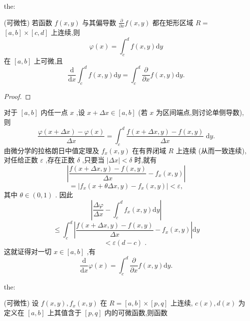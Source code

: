 \begin{theorem}{}{the:}

\end{theorem}
 (可微性) 若函数 \(f\left( {x,y}\right)\) 与其偏导数 \(\frac{\partial }{\partial x}f\left( {x,y}\right)\) 都在矩形区域 \(R =\)  \(\left\lbrack  {a,b}\right\rbrack   \times  \left\lbrack  {c,d}\right\rbrack\) 上连续,则
\[
\varphi \left( x\right)  = {\int }_{c}^{d}f\left( {x,y}\right) \mathrm{d}y
\]
在 \(\left\lbrack  {a,b}\right\rbrack\) 上可微,且
\[
\frac{\mathrm{d}}{\mathrm{d}x}{\int }_{c}^{d}f\left( {x,y}\right) \mathrm{d}y = {\int }_{c}^{d}\frac{\partial }{\partial x}f\left( {x,y}\right) \mathrm{d}y.
\]
\begin{proof}

\end{proof}
对于 \(\left\lbrack  {a,b}\right\rbrack\) 内任一点 \(x\) ,设 \(x + {\Delta x} \in  \left\lbrack  {a,b}\right\rbrack\) (若 \(x\) 为区间端点,则讨论单侧导数), 则
\[
\frac{\varphi \left( {x + {\Delta x}}\right)  - \varphi \left( x\right) }{\Delta x} = {\int }_{c}^{d}\frac{f\left( {x + {\Delta x},y}\right)  - f\left( {x,y}\right) }{\Delta x}\mathrm{\;d}y.
\]
由微分学的拉格朗日中值定理及 \({f}_{x}\left( {x,y}\right)\) 在有界闭域 \(R\) 上连续 (从而一致连续),对任给正数 \(\varepsilon\) ,存在正数 \(\delta\) ,只要当 \(\left| {\Delta x}\right|  < \delta\) 时,就有
\[
\left| {\frac{f\left( {x + {\Delta x},y}\right)  - f\left( {x,y}\right) }{\Delta x} - {f}_{x}\left( {x,y}\right) }\right|
\]
\[
= \left| {{f}_{x}\left( {x + {\theta \Delta x},y}\right)  - {f}_{x}\left( {x,y}\right) }\right|  < \varepsilon ,
\]
其中 \(\theta  \in  \left( {0,1}\right)\) . 因此
\[
\left| {\frac{\Delta \varphi }{\Delta x} - {\int }_{c}^{d}{f}_{x}\left( {x,y}\right) \mathrm{d}y}\right|
\]
\[
\leq  {\int }_{c}^{d}\left| {\frac{f\left( {x + {\Delta x},y}\right)  - f\left( {x,y}\right) }{\Delta x} - {f}_{x}\left( {x,y}\right) }\right| \mathrm{d}y
\]
\[
< \varepsilon \left( {d - c}\right) \text{ . }
\]
这就证得对一切 \(x \in  \left\lbrack  {a,b}\right\rbrack\) ,有
\[
\frac{\mathrm{d}}{\mathrm{d}x}\varphi \left( x\right)  = {\int }_{c}^{d}\frac{\partial }{\partial x}f\left( {x,y}\right) \mathrm{d}y.
\]
\begin{theorem}{}{the:}

\end{theorem}
 (可微性) 设 \(f\left( {x,y}\right) ,{f}_{x}\left( {x,y}\right)\) 在 \(R = \left\lbrack  {a,b}\right\rbrack   \times  \left\lbrack  {p,q}\right\rbrack\) 上连续, \(c\left( x\right) ,d\left( x\right)\) 为定义在 \(\left\lbrack  {a,b}\right\rbrack\) 上其值含于 \(\left\lbrack  {p,q}\right\rbrack\) 内的可微函数,则函数
